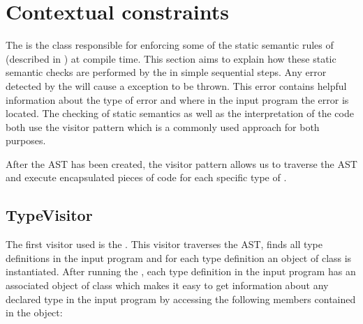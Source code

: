 
\section{Contextual constraints}
\label{sec:staticsemantics}

The  is the class responsible for enforcing some of the
static semantic rules of \productname{} (described in ) at
compile time. This section aims to explain how these static semantic checks
are performed by the  in simple sequential steps. Any
error detected by the  will cause a 
exception to be thrown. This error contains helpful information about the type
of error and where in the input program the error is located. The checking of
static semantics as well as the interpretation of the code both use the visitor
pattern which is a commonly used approach for both purposes.

After the AST has been created, the visitor pattern allows us to traverse the
AST and execute encapsulated pieces of code for each specific type of
. 

\subsection{TypeVisitor}
The first visitor used is the . This visitor traverses the
AST, finds all type definitions in the input program and for each type
definition an object of class  is instantiated. After
running the , each type definition in the input program
has an associated object of class  which makes it easy
to get information about any declared type in the input program by accessing the
following members contained in the  object:

